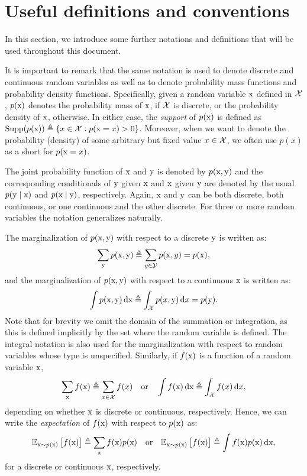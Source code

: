 \section{Useful definitions and conventions}
\label{sec:definitions}
In this section, we introduce some further notations and definitions that will be used throughout this document.

It is important to remark that the same notation is used to denote discrete and continuous random variables as well as to denote probability mass functions and probability density functions. Specifically, given a random variable ${\textnormal{x}}$ defined in ${\mathcal{X}}$, $p({\textnormal{x}})$ denotes the probability mass of ${\textnormal{x}}$, if ${\mathcal{X}}$ is discrete, or the probability density of ${\textnormal{x}}$, otherwise. In either case, the \emph{support} of $p({\textnormal{x}})$ is defined as $\mathrm{Supp}(p({\textnormal{x}})) \triangleq \lbrace x \in {\mathcal{X}}: p({\textnormal{x}}=x) > 0 \rbrace$. Moreover, when we want to denote the probability (density) of some arbitrary but fixed value $x \in {\mathcal{X}}$, we often use $p(x)$ as a short for $p({\textnormal{x}}=x)$.

The joint probability function of ${\textnormal{x}}$ and ${\textnormal{y}}$ is denoted by $p({\textnormal{x}},{\textnormal{y}})$ and the corresponding conditionals of ${\textnormal{y}}$ given ${\textnormal{x}}$ and ${\textnormal{x}}$ given ${\textnormal{y}}$ are denoted by the usual $p({\textnormal{y}} \mid {\textnormal{x}})$ and $p({\textnormal{x}} \mid {\textnormal{y}})$, respectively. Again, ${\textnormal{x}}$ and ${\textnormal{y}}$ can be both discrete, both continuous, or one continuous and the other discrete. For three or more random variables the notation generalizes naturally.

The marginalization of $p({\textnormal{x}},{\textnormal{y}})$ with respect to a discrete ${\textnormal{y}}$ is written as:
\begin{equation}
  \sum_{{\textnormal{y}}} p({\textnormal{x}},{\textnormal{y}}) \triangleq \sum_{y \in {\mathcal{Y}}} p({\textnormal{x}},y) = p({\textnormal{x}}),
\end{equation}
and the marginalization of $p({\textnormal{x}},{\textnormal{y}})$ with respect to a continuous ${\textnormal{x}}$ is written as:
\begin{equation}
    \int p({\textnormal{x}},{\textnormal{y}}) {\,\text{d}} {\textnormal{x}} \triangleq \int_{{\mathcal{X}}} p(x,{\textnormal{y}}) {\,\text{d}} x = p({\textnormal{y}}).
\end{equation}
Note that for brevity we omit the domain of the summation or integration, as this is defined implicitly by the set where the random variable is defined. The integral notation is also used for the marginalization with respect to random variables whose type is unspecified. Similarly, if $f({\textnormal{x}})$ is a function of a random variable ${\textnormal{x}}$,
\begin{equation}
    \sum_{\textnormal{x}} f({\textnormal{x}}) \triangleq \sum_{x \in {\mathcal{X}}} f(x) \quad \text{or} \quad \int f({\textnormal{x}}) {\,\text{d}} {\textnormal{x}} \triangleq \int_{\mathcal{X}} f(x) {\,\text{d}} x,
\end{equation}
depending on whether ${\textnormal{x}}$ is discrete or continuous, respectively. Hence, we can write the \emph{expectation} of $f({\textnormal{x}})$ with respect to $p({\textnormal{x}})$ as:
\begin{equation}
    \mathbb{E}_{{\textnormal{x}} \sim p({\textnormal{x}})} \left[f({\textnormal{x}})\right] \triangleq \sum_{\textnormal{x}} f({\textnormal{x}}) p({\textnormal{x}}) \quad \text{or} \quad \mathbb{E}_{{\textnormal{x}} \sim p({\textnormal{x}})} \left[f({\textnormal{x}})\right] \triangleq \int f({\textnormal{x}}) p({\textnormal{x}}) {\,\text{d}} {\textnormal{x}},
\end{equation}
for a discrete or continuous ${\textnormal{x}}$, respectively.

